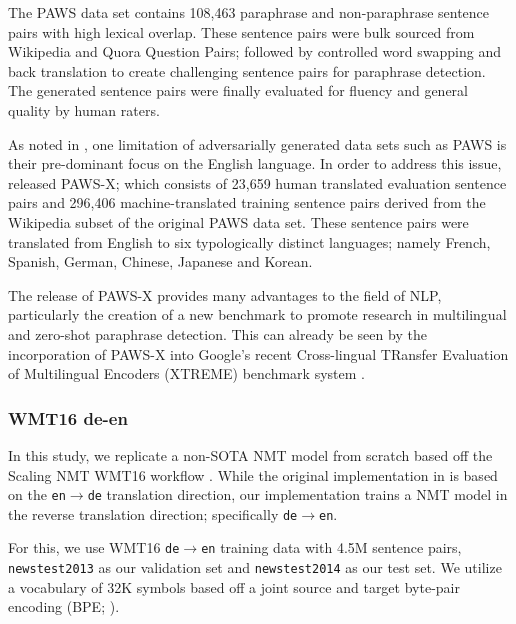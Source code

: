 \documentclass[11pt,a4paper]{article}
\begin{document}
The PAWS data set contains 108,463 paraphrase and non-paraphrase sentence pairs with high lexical overlap. These sentence pairs were bulk sourced from Wikipedia and Quora Question Pairs; followed by controlled word swapping and back translation to create challenging sentence pairs for paraphrase detection. The generated sentence pairs were finally evaluated for fluency and general quality by human raters.

As noted in \citet{pawsx2019emnlp}, one limitation of adversarially generated data sets such as PAWS is their pre-dominant focus on the English language. In order to address this issue, \citet{pawsx2019emnlp} released PAWS-X; which consists of 23,659 human translated evaluation sentence pairs and 296,406 machine-translated training sentence pairs derived from the Wikipedia subset of the original PAWS data set. These sentence pairs were translated from English to six typologically distinct languages; namely French, Spanish, German, Chinese, Japanese and Korean.

The release of PAWS-X provides many advantages to the field of NLP, particularly the creation of a new benchmark to promote research in multilingual and zero-shot paraphrase detection. This can already be seen by the incorporation of PAWS-X into Google's recent Cross-lingual TRansfer Evaluation of Multilingual Encoders (XTREME) benchmark system \cite{hu2020xtreme}.

\subsubsection{WMT16 de-en}

In this study, we replicate a non-SOTA NMT model from scratch based off the Scaling NMT WMT16 workflow \cite{ott2018scaling}. While the original implementation in \citet{ott2018scaling} is based on the \texttt{en$\rightarrow$de} translation direction, our implementation trains a NMT model in the reverse translation direction; specifically \texttt{de$\rightarrow$en}.

For this, we use WMT16 \texttt{de$\rightarrow$en} training data with 4.5M sentence pairs, \texttt{newstest2013} as our validation set and \texttt{newstest2014} as our test set. We utilize a vocabulary of 32K symbols based off a joint source and target byte-pair encoding (BPE; \citealt{sennrich2015neural}).   

\end{document}
